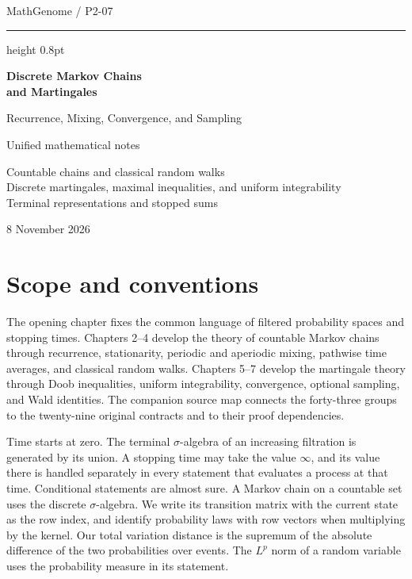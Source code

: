 \documentclass[11pt,oneside,openany]{book}
\theoremstyle{plain}
\theoremstyle{definition}
\theoremstyle{remark}
\begin{document}
\frontmatter
\hypersetup{pageanchor=false}
\begin{titlepage}
\thispagestyle{empty}
\vspace*{27mm}
{\large MathGenome \enspace / \enspace P2-07\par}
\vspace{8mm}
\hrule height 0.8pt
\vspace{11mm}
{\Huge\bfseries Discrete Markov Chains\\[3pt] and Martingales\par}
\vspace{4mm}
{\LARGE Recurrence, Mixing, Convergence, and Sampling\par}
\vspace{12mm}
{\large Unified mathematical notes\par}
\vspace{6mm}
{\normalsize Countable chains and classical random walks\\
Discrete martingales, maximal inequalities, and uniform integrability\\
Terminal representations and stopped sums\par}
\vfill
{\large 8 November 2026\par}
\end{titlepage}
\hypersetup{pageanchor=true}
\begingroup
\small
\setlength{\baselineskip}{11.6pt}
\tableofcontents
\endgroup

\chapter*{Scope and conventions}

The opening chapter fixes the common language of filtered probability
spaces and stopping times. Chapters 2--4 develop the theory of countable
Markov chains through recurrence, stationarity, periodic and aperiodic
mixing, pathwise time averages, and classical random walks.
Chapters 5--7 develop the martingale theory through Doob inequalities,
uniform integrability, convergence, optional sampling, and Wald
identities. The companion source map connects the forty-three groups
to the twenty-nine original contracts and to their proof dependencies.

Time starts at zero. The terminal \(\sigma\)-algebra of an increasing
filtration is generated by its union. A stopping time may take the
value \(\infty\), and its value there is handled separately in every
statement that evaluates a process at that time. Conditional statements
are almost sure. A Markov chain on a countable set uses the discrete
\(\sigma\)-algebra. We write its transition matrix with the current
state as the row index, and identify probability laws with row vectors
when multiplying by the kernel. Our total variation distance is the
supremum of the absolute difference of the two probabilities over
events. The \(L^p\) norm of a random variable uses the probability
measure in its statement.
\end{document}
